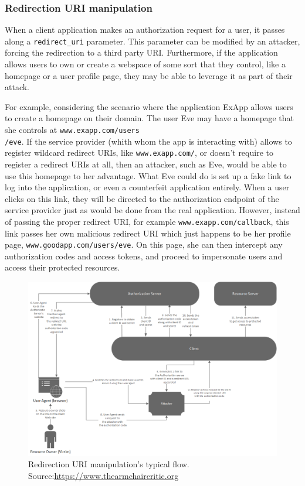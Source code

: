\subsubsection{Redirection URI manipulation}
When a client application makes an authorization request for a user, it passes along a \texttt{redirect\_uri} parameter. This parameter can be modified by an attacker, forcing the redirection to a third party URI.
Furthermore, if the application allows users to own or create a webspace of some sort that they control, like a homepage or a user profile page, they may be able to leverage it as part of their attack.

For example, considering the scenario where the application ExApp allows users to create a homepage on their domain. The user Eve may have a homepage that she controls at \texttt{www.exapp.com/users \\ /eve}. If the service provider (whith whom the app is interacting with) allows to register wildcard redirect URIs, like \texttt{www.exapp.com/\*}, or doesn't require to register a redirect URIs at all, then an attacker, such as Eve, would be able to use this homepage to her advantage.
What Eve could do is set up a fake link to log into the application, or even a counterfeit application entirely. When a user clicks on this link, they will be directed to the authorization endpoint of the service provider just as would be done from the real application. However, instead of passing the proper redirect URI, for example \texttt{www.exapp.com/callback}, this link passes her own malicious redirect URI which just happens to be her profile page, \texttt{www.goodapp.com/users/eve}. On this page, she can then intercept any authorization codes and access tokens, and proceed to impersonate users and access their protected resources.


\begin{figure}[ht]
    \centering
    \includegraphics[scale=0.65]{chapters/images/chp4/authCodeURIAttack.png}
    \caption[Redirection URI manipulation's typical flow]{Redirection URI manipulation's typical flow.\\Source:\hspace{0.2cm}\url{https://www.thearmchaircritic.org}}
    \label{fig:reduri}
\end{figure}

